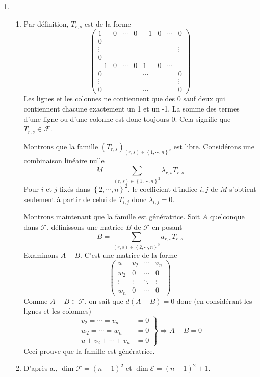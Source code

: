 \begin{enumerate}
\item 
\begin{enumerate}
\item  Par d\'{e}finition, $T_{r,s}$ est de la forme 
\[
\begin{pmatrix}
1      & 0  & \cdots & 0  & -1 & 0 & \cdots & 0 \\ 
0      &    &        &    &        &   &        &   \\ 
\vdots &    &        &    &        &   &        & \vdots\\ 
0      &    &        &    &        &   &        &   \\
-1     & 0  & \cdots & 0  &  1     & 0 & \cdots &   \\ 
0      &    &        &    & \cdots &   &        & 0 \\ 
\vdots &    &        &    &        &   &        & \vdots\\ 
0      &    &        &    & \cdots &   &        & 0
\end{pmatrix}
\]
Les lignes et les colonnes ne contiennent que des 0 sauf deux qui contiennent chacune exactement un 1 et un -1. La somme des termes d'une ligne ou d'une colonne est donc toujours 0. Cela signifie que $T_{r,s}\in \mathcal{F}$.

Montrons que la famille $(T_{r,s})_{(r,s)\in \left\{ 1,\cdots ,n\right\}^{2}}$ est libre.\newline
Consid\'{e}rons une combinaison lin\'{e}aire nulle 
\[
M=\sum_{(r,s)\in \left\{ 1,\cdots ,n\right\} ^{2}}\lambda _{r,s}T_{r,s}
\]
Pour $i$ et $j$ fix\'{e}s dans $\left\{ 2,\cdots ,n\right\} ^{2}$, le coefficient d'indice $i,j$ de $M$ s'obtient seulement \`{a} partir de celui de $T_{i,j}$ donc $\lambda _{i,j}=0$.

Montrons maintenant que la famille est g\'{e}n\'{e}ratrice.\newline
Soit $A$ quelconque dans $\mathcal{F}$, d\'{e}finissons une matrice $B$ de $\mathcal{F}$ en posant 
\[
B=\sum_{(r,s)\in \left\{ 2,\cdots ,n\right\} ^{2}}a_{r,s}T_{r,s}
\]
Examinons $A-B$. C'est une matrice de la forme 
\[
\begin{pmatrix}
u & v_{2} & \cdots  & v_{n} \\ 
w_{2} & 0 & \cdots  & 0 \\ 
\vdots  & \vdots  & \ddots  & \vdots  \\ 
w_{n} & 0 & \cdots  & 0
\end{pmatrix}
\]
Comme $A-B\in \mathcal{F}$, on sait que $d(A-B)=0$ donc (en considérant les lignes et les colonnes) 
\begin{displaymath}
 \left. 
\begin{aligned}
 v_{2}=\cdots =v_{n} &= 0\\
 w_{2}=\cdots =w_{n} &= 0 \\
 u+v_{2}+\cdots +v_{n} &=0
\end{aligned}
\right\rbrace 
\Rightarrow A-B=0
\end{displaymath}
Ceci prouve que la famille est g\'{e}n\'{e}ratrice.

\item  D'apr\`{e}s a., $\dim \mathcal{F}=(n-1)^{2}$ et $\dim \mathcal{E}=(n-1)^{2}+1$.
\end{enumerate}
\end{enumerate}
